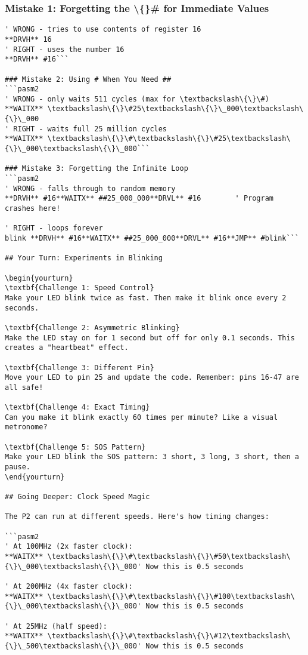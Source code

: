 \documentclass[11pt]{book}
\begin{document}
\hypertarget{mistake-1-forgetting-the-for-immediate-values}{%
\subsubsection{\texorpdfstring{Mistake 1: Forgetting the
\textbackslash\{\}\# for Immediate
Values}{Mistake 1: Forgetting the \{\}\# for Immediate Values}}\label{mistake-1-forgetting-the-for-immediate-values}}

\begin{lstlisting}
' WRONG - tries to use contents of register 16
**DRVH** 16
' RIGHT - uses the number 16
**DRVH** #16```

### Mistake 2: Using # When You Need ##
```pasm2
' WRONG - only waits 511 cycles (max for \textbackslash\{\}\#)
**WAITX** \textbackslash\{\}\#25\textbackslash\{\}\_000\textbackslash\{\}\_000
' RIGHT - waits full 25 million cycles
**WAITX** \textbackslash\{\}\#\textbackslash\{\}\#25\textbackslash\{\}\_000\textbackslash\{\}\_000```

### Mistake 3: Forgetting the Infinite Loop
```pasm2
' WRONG - falls through to random memory
**DRVH** #16**WAITX** ##25_000_000**DRVL** #16        ' Program crashes here!

' RIGHT - loops forever
blink **DRVH** #16**WAITX** ##25_000_000**DRVL** #16**JMP** #blink```

## Your Turn: Experiments in Blinking

\begin{yourturn}
\textbf{Challenge 1: Speed Control}
Make your LED blink twice as fast. Then make it blink once every 2 seconds.

\textbf{Challenge 2: Asymmetric Blinking}  
Make the LED stay on for 1 second but off for only 0.1 seconds. This creates a "heartbeat" effect.

\textbf{Challenge 3: Different Pin}
Move your LED to pin 25 and update the code. Remember: pins 16-47 are all safe!

\textbf{Challenge 4: Exact Timing}
Can you make it blink exactly 60 times per minute? Like a visual metronome?

\textbf{Challenge 5: SOS Pattern}
Make your LED blink the SOS pattern: 3 short, 3 long, 3 short, then a pause.
\end{yourturn}

## Going Deeper: Clock Speed Magic

The P2 can run at different speeds. Here's how timing changes:

```pasm2
' At 100MHz (2x faster clock):
**WAITX** \textbackslash\{\}\#\textbackslash\{\}\#50\textbackslash\{\}\_000\textbackslash\{\}\_000' Now this is 0.5 seconds

' At 200MHz (4x faster clock):  
**WAITX** \textbackslash\{\}\#\textbackslash\{\}\#100\textbackslash\{\}\_000\textbackslash\{\}\_000' Now this is 0.5 seconds

' At 25MHz (half speed):
**WAITX** \textbackslash\{\}\#\textbackslash\{\}\#12\textbackslash\{\}\_500\textbackslash\{\}\_000' Now this is 0.5 seconds
\end{lstlisting}
\end{document}
